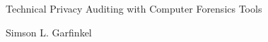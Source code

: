 \documentclass[11pt,fleqn,letter]{book} %
\begin{document}

\begingroup
\thispagestyle{empty}
\centering
\vspace*{9cm}
\par\normalfont\fontsize{35}{35}\sffamily\selectfont
Technical Privacy Auditing with Computer Forensics Tools\par %
\vspace*{1cm}
{\Huge Simson L. Garfinkel}\par %
\endgroup

\end{document}

